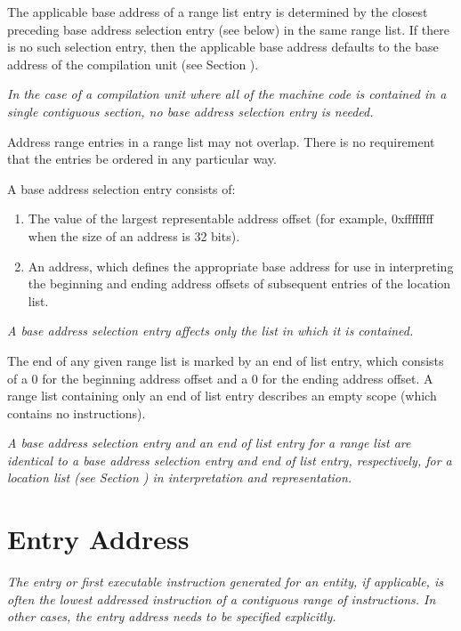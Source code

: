 The applicable base address of a range list entry is determined
by the closest preceding base address selection entry (see
below) in the same range list. If there is no such selection
entry, then the applicable base address defaults to the base
address of the compilation unit 
(see Section ).

\textit{In the case of a compilation unit where all of the machine
code is contained in a single contiguous section, no base
address selection entry is needed.}

Address range entries in
a range list may not overlap. There is no requirement that
the entries be ordered in any particular way.

A base address selection entry consists of:

\begin{enumerate}[1]
\item The value of the largest representable address offset (for example, 0xffffffff when the size of
an address is 32 bits).

\item An address, which defines the appropriate base address for use in interpreting the beginning
and ending address offsets of subsequent entries of the location list.
\end{enumerate}
\textit{A base address selection entry 
affects only the list in which it is contained.}


The end of any given range list is marked by an 
end of list entry, 
which consists of a 0 for the beginning address
offset and a 0 for the ending address offset. A range list
containing only an end of list entry describes an empty scope
(which contains no instructions).

\textit{A base address selection entry and an 
end of list entry for
a range list are identical to a base address selection entry
and end of list entry, respectively, for a location list
(see Section ) 
in interpretation and representation.}



\section{Entry Address}
\label{chap:entryaddress}
\textit{The entry or first executable instruction generated
for an entity, if applicable, is often the lowest addressed
instruction of a contiguous range of instructions. In other
cases, the entry address needs to be specified explicitly.}

